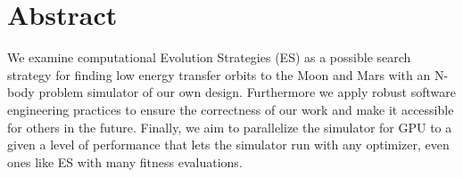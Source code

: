 \chapter{Abstract}
We examine computational Evolution Strategies (ES) as a possible search strategy for finding low energy transfer orbits to the Moon and Mars with an N-body problem simulator of our own design. Furthermore we apply robust software engineering practices to ensure the correctness of our work and make it accessible for others in the future. Finally, we aim to parallelize the simulator for GPU to a given a level of performance that lets the simulator run with any optimizer, even ones like ES with many fitness evaluations.